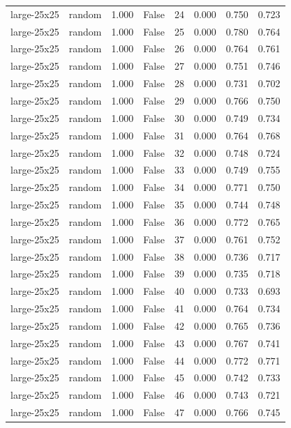 \begin{tabular}{llrrrrrr}
large-25x25 & random & 1.000 & False & 24 & 0.000 & 0.750 & 0.723 \\
large-25x25 & random & 1.000 & False & 25 & 0.000 & 0.780 & 0.764 \\
large-25x25 & random & 1.000 & False & 26 & 0.000 & 0.764 & 0.761 \\
large-25x25 & random & 1.000 & False & 27 & 0.000 & 0.751 & 0.746 \\
large-25x25 & random & 1.000 & False & 28 & 0.000 & 0.731 & 0.702 \\
large-25x25 & random & 1.000 & False & 29 & 0.000 & 0.766 & 0.750 \\
large-25x25 & random & 1.000 & False & 30 & 0.000 & 0.749 & 0.734 \\
large-25x25 & random & 1.000 & False & 31 & 0.000 & 0.764 & 0.768 \\
large-25x25 & random & 1.000 & False & 32 & 0.000 & 0.748 & 0.724 \\
large-25x25 & random & 1.000 & False & 33 & 0.000 & 0.749 & 0.755 \\
large-25x25 & random & 1.000 & False & 34 & 0.000 & 0.771 & 0.750 \\
large-25x25 & random & 1.000 & False & 35 & 0.000 & 0.744 & 0.748 \\
large-25x25 & random & 1.000 & False & 36 & 0.000 & 0.772 & 0.765 \\
large-25x25 & random & 1.000 & False & 37 & 0.000 & 0.761 & 0.752 \\
large-25x25 & random & 1.000 & False & 38 & 0.000 & 0.736 & 0.717 \\
large-25x25 & random & 1.000 & False & 39 & 0.000 & 0.735 & 0.718 \\
large-25x25 & random & 1.000 & False & 40 & 0.000 & 0.733 & 0.693 \\
large-25x25 & random & 1.000 & False & 41 & 0.000 & 0.764 & 0.734 \\
large-25x25 & random & 1.000 & False & 42 & 0.000 & 0.765 & 0.736 \\
large-25x25 & random & 1.000 & False & 43 & 0.000 & 0.767 & 0.741 \\
large-25x25 & random & 1.000 & False & 44 & 0.000 & 0.772 & 0.771 \\
large-25x25 & random & 1.000 & False & 45 & 0.000 & 0.742 & 0.733 \\
large-25x25 & random & 1.000 & False & 46 & 0.000 & 0.743 & 0.721 \\
large-25x25 & random & 1.000 & False & 47 & 0.000 & 0.766 & 0.745 \\

\end{tabular}
